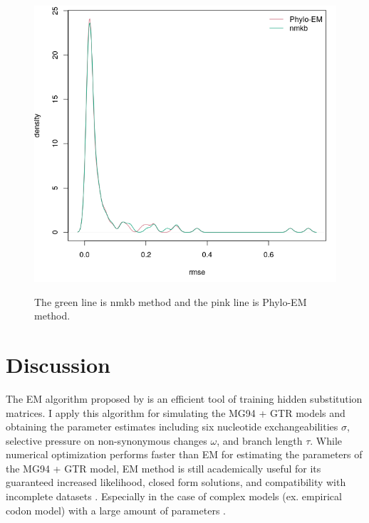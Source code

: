 \begin{figure}[H]
     \begin{minipage}[t]{1\textwidth }
     \centering
     \includegraphics[width=\linewidth]{Fig7.png}
     {{The green line is nmkb method and the pink line is Phylo-EM method.}
     \par}
     \end{minipage}
\end{figure}

\section{Discussion}
The EM algorithm proposed by \cite{holmes2002expectation} is an efficient tool of training hidden substitution matrices. I apply this algorithm for simulating the MG94 + GTR models and obtaining the parameter estimates including six nucleotide exchangeabilities $\sigma$, selective pressure on non-synonymous changes $\omega$, and branch length $\tau$. While numerical optimization performs faster than EM for estimating the parameters of the MG94 + GTR model, EM method is still academically useful for its guaranteed increased likelihood, closed form solutions, and compatibility with incomplete datasets \parencite{couvreur1997algorithm}. Especially in the case of complex models (ex. empirical codon model) with a large amount of parameters \parencite{kosiol2007empirical}.   


